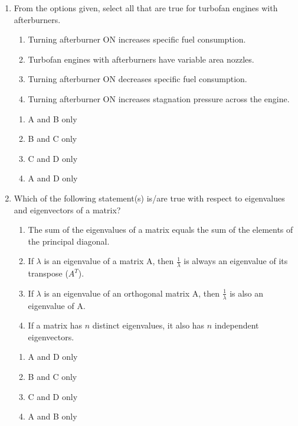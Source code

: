 \documentclass{article}
\begin{document}
\begin{enumerate}[leftmargin=*, resume]
\item From the options given, select all that are true for turbofan engines with afterburners.
\begin{enumerate}
\item Turning afterburner ON increases specific fuel consumption.
\item Turbofan engines with afterburners have variable area nozzles.
\item Turning afterburner ON decreases specific fuel consumption.
\item Turning afterburner ON increases stagnation pressure across the engine.
\end{enumerate}
\begin{multicols}{4}
\begin{enumerate}
\item A and B only
\item B and C only
\item C and D only
\item A and D only
\end{enumerate}
\end{multicols}

\item Which of the following statement(s) is/are true with respect to eigenvalues and eigenvectors of a matrix?
\begin{enumerate}
\item The sum of the eigenvalues of a matrix equals the sum of the elements of the principal diagonal.
\item If $\lambda$ is an eigenvalue of a matrix A, then $\frac{1}{\lambda}$ is always an eigenvalue of its transpose ($A^T$).
\item If $\lambda$ is an eigenvalue of an orthogonal matrix A, then $\frac{1}{\lambda}$ is also an eigenvalue of A.
\item If a matrix has $n$ distinct eigenvalues, it also has $n$ independent eigenvectors.
\end{enumerate}
\begin{multicols}{4}
\begin{enumerate}
\item A and D only
\item B and C only
\item C and D only
\item A and B only
\end{enumerate}
\end{multicols}


\end{enumerate}
\end{document}
